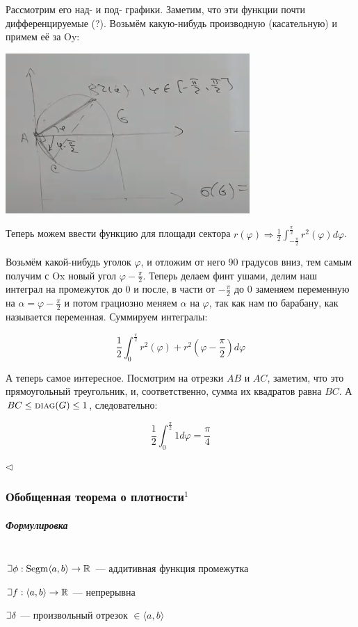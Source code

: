 \documentclass{article}
\def\letus{%
\mathord{\setbox0=\hbox{$\exists$}%
         \hbox{\kern 0.125\wd0%
               \vbox to \ht0{%
                  \hrule width 0.75\wd0%
                  \vfill%
                  \hrule width 0.75\wd0}%
               \vrule height \ht0%
               \kern 0.125\wd0}%
       }%
        }
\DeclareMathOperator{\segm}{Segm}
\let\vanillasubparagraph\subparagraph
\renewcommand{\subparagraph}[1]{\vanillasubparagraph{#1}\mbox{}\\}
\begin{document}
Рассмотрим его над- и под- графики. Заметим, что эти функции почти дифференцируемые (?). Возьмём какую-нибудь производную (касательную) и примем её за Oy:

\includegraphics[]{../images/isoperim2.png}

Теперь можем ввести функцию для площади сектора $r(\varphi) \Rightarrow \frac{1}{2}\int_{-\frac{\pi}{2}}^{\frac{\pi}{2}}{r^2(\varphi)d\varphi}$.

Возьмём какой-нибудь уголок $\varphi$, и отложим от него 90 градусов вниз, тем самым получим с Ox новый угол $\varphi - \frac{\pi}{2}$. Теперь делаем финт ушами, делим наш интеграл на промежуток до 0 и после, в части от $-\frac{\pi}{2}$ до 0 заменяем переменную на $\alpha = \varphi - \frac{\pi}{2}$ и потом грациозно меняем $\alpha$ на $\varphi$, так как нам по барабану, как называется переменная. Суммируем интегралы:

\[\frac{1}{2}\int_0^{\frac{\pi}{2}}{r^2(\varphi) + r^2(\varphi - \frac{\pi}{2}) d\varphi}\]

А теперь самое интересное. Посмотрим на отрезки $AB$ и $AC$, заметим, что это прямоугольный треугольник, и, соответственно, сумма их квадратов равна $BC$. А $BC \le \textsc{diag}(G) \le 1$, следовательно:

\[\frac{1}{2}\int_0^{\frac{\pi}{2}}{1 d\varphi} = \frac{\pi}{4}\]

$\lhd$

\subsubsection{Обобщенная теорема о плотности\texorpdfstring{$^1$}{}}
\subparagraph{Формулировка}
$\letus \phi: \segm \langle a, b \rangle \rightarrow \mathbb{R}$ --- аддитивная функция промежутка

$\letus f: \langle a, b \rangle \rightarrow \mathbb{R}$ --- непрерывна

$\letus \delta$ --- произвольный отрезок $\in \langle a, b \rangle$
\end{document}
